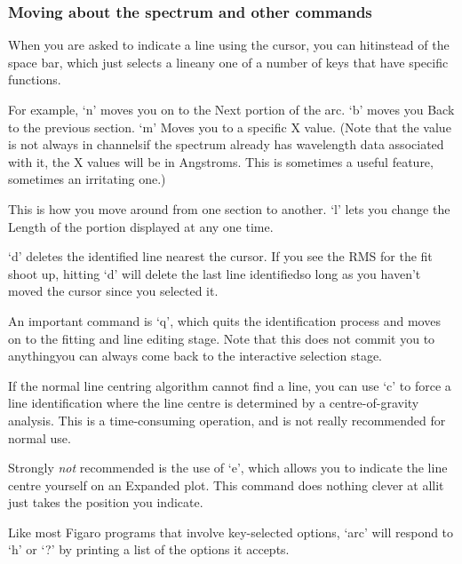 
\subsubsection{\label{techno10moving}Moving about the spectrum and other commands}

   When you are asked to indicate a line using the cursor, you can
   hit\latorhtm{---}{-}instead of the space bar, which just selects a
   line\latorhtm{---}{-}any one
   of a number of keys that have specific functions.

   For example, `n' moves you on to the Next portion of the arc. `b'
   moves you Back to the previous section.  `m' Moves you to a specific
   X value.  (Note that the value is not always in channels\latorhtm{---}{-}if
   the
   spectrum already has wavelength data associated with it, the X values
   will be in Angstroms.  This is sometimes a useful feature, sometimes
   an irritating one.)

   This is how you move around from one section to another.  `l' lets
   you change the Length of the portion displayed at any one time.

   `d' deletes the identified line nearest the cursor.  If you see the
   RMS for the fit shoot up, hitting `d' will delete the last line
   identified\latorhtm{---}{-}so long as you haven't moved the cursor
   since you selected it.

   An important command is `q', which quits the identification process
   and moves on to the fitting and line editing stage. Note that this
   does not commit you to anything\latorhtm{---}{-}you can always come back
   to the interactive selection stage.

   If the normal line centring algorithm cannot find a line, you can
   use `c' to force a line identification where the line centre is
   determined by a centre-of-gravity analysis.  This is a time-consuming
   operation, and is not really recommended for normal use.

   Strongly {\em not\/}
   recommended is the use of `e', which allows you to indicate the line
   centre yourself on an Expanded plot.  This command does nothing
   clever at all\latorhtm{---}{-}it just takes the position you indicate.

   Like most Figaro programs that involve key-selected options, `arc'
   will respond to `h' or `?' by printing a list of the options it
   accepts.

